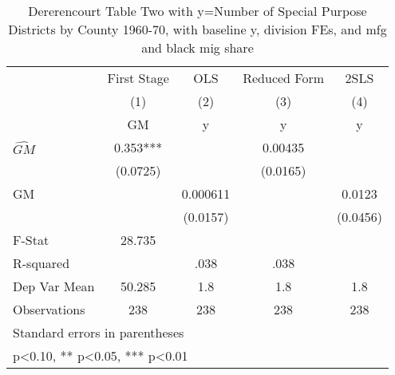 \begin{table}[htbp]\centering
\def\sym#1{\ifmmode^{#1}\else\(^{#1}\)\fi}
\caption{Dererencourt Table Two with y=Number of Special Purpose Districts by County 1960-70, with baseline y, division FEs, and mfg and black mig share}
\begin{tabular}{l*{4}{c}}
\toprule
                    & First Stage   &         OLS   &Reduced Form   &        2SLS   \\
                    &\multicolumn{1}{c}{(1)}&\multicolumn{1}{c}{(2)}&\multicolumn{1}{c}{(3)}&\multicolumn{1}{c}{(4)}\\
                    &\multicolumn{1}{c}{GM}&\multicolumn{1}{c}{y}&\multicolumn{1}{c}{y}&\multicolumn{1}{c}{y}\\
\midrule
$\hat{GM}$          &       0.353***&               &     0.00435   &               \\
                    &    (0.0725)   &               &    (0.0165)   &               \\
\addlinespace
GM                  &               &    0.000611   &               &      0.0123   \\
                    &               &    (0.0157)   &               &    (0.0456)   \\
\midrule
F-Stat              &      28.735   &               &               &               \\
R-squared           &               &        .038   &        .038   &               \\
Dep Var Mean        &      50.285   &         1.8   &         1.8   &         1.8   \\
Observations        &         238   &         238   &         238   &         238   \\
\bottomrule
\multicolumn{5}{l}{\footnotesize Standard errors in parentheses}\\
\multicolumn{5}{l}{\footnotesize * p<0.10, ** p<0.05, *** p<0.01}\\
\end{tabular}
\end{table}
